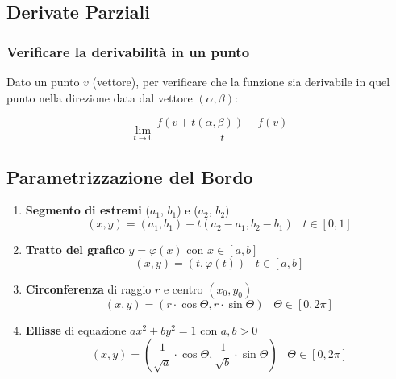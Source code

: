 \documentclass{article}
\begin{document}
\subsection{Derivate Parziali}

\subsubsection{Verificare la derivabilità in un punto}

Dato un punto $v$ (vettore), per verificare che la funzione sia derivabile in quel punto nella direzione data dal vettore $(\alpha, \beta)$:

\begin{equation*}
    \displaystyle \lim_{t \to 0} \frac{f(v + t(\alpha, \beta)) - f(v)}{t}
\end{equation*}

\subsection{Parametrizzazione del Bordo}

\begin{enumerate}
    \item \textbf{Segmento di estremi} ($a_1$, $b_1$) e ($a_2$, $b_2$)
        \begin{equation*}
            (x, y) = (a_1, b_1) + t(a_2 - a_1, b_2 - b_1) \; \; \; t \in [0, 1] 
        \end{equation*}
    \item \textbf{Tratto del grafico}
        $y = \varphi(x)$ con $x \in [a, b]$
        \begin{equation*}
            (x, y) = (t, \varphi(t)) \; \; \; t \in [a, b]
        \end{equation*}
    \item \textbf{Circonferenza} di raggio $r$ e centro $(x_0, y_0)$
        \begin{equation*}
            (x, y) = (r \cdot \cos \Theta, r \cdot \sin \Theta) \; \; \; \Theta \in [0, 2\pi]
        \end{equation*}
    \item \textbf{Ellisse} di equazione $ax^2 + by^2 = 1$ con $a, b > 0$
        \begin{equation*}
            (x, y) = (\frac{1}{\sqrt{a}} \cdot \cos \Theta, \frac{1}{\sqrt{b}} \cdot \sin \Theta) \; \; \; \Theta \in [0, 2\pi]
        \end{equation*}
\end{enumerate}
\end{document}
